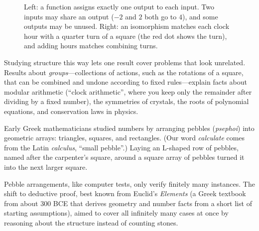 \begin{figure}[htbp]
\caption{Left: a function assigns exactly one output to each input. Two inputs may share an output ($-2$ and $2$ both go to $4$), and some outputs may be unused. Right: an isomorphism matches each clock hour with a quarter turn of a square (the red dot shows the turn), and adding hours matches combining turns.}
\label{01:fig-function-isomorphism}
\end{figure}

Studying structure this way lets one result cover problems that look unrelated. Results about \emph{groups}---collections of actions, such as the rotations of a square, that can be combined and undone according to fixed rules---explain facts about modular arithmetic (``clock arithmetic'', where you keep only the remainder after dividing by a fixed number), the symmetries of crystals, the roots of polynomial equations, and conservation laws in physics.

\begin{historybox}
Early Greek mathematicians studied numbers by arranging pebbles (\emph{psephoi}) into geometric arrays: triangles, squares, and rectangles. (Our word \emph{calculate} comes from the Latin \emph{calculus}, ``small pebble''.) Laying an L-shaped row of pebbles, named after the carpenter's square, around a square array of pebbles turned it into the next larger square.

Pebble arrangements, like computer tests, only verify finitely many instances. The shift to deductive proof, best known from Euclid's \emph{Elements} (a Greek textbook from about 300 BCE that derives geometry and number facts from a short list of starting assumptions), aimed to cover all infinitely many cases at once by reasoning about the structure instead of counting stones.
\end{historybox}

